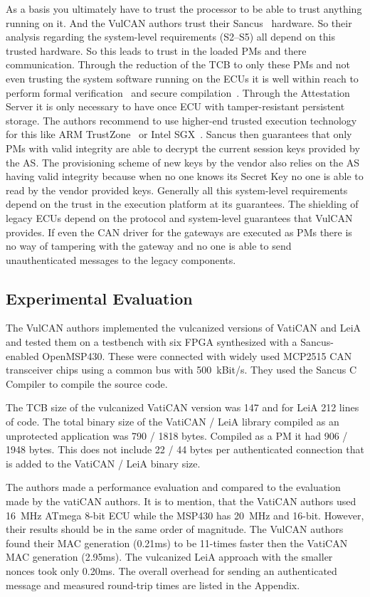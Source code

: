 \smallskip
As a basis you ultimately have to trust the processor to be able to trust
anything running on it. And the VulCAN authors trust their Sancus~\cite{Noorman}
hardware. So their analysis regarding the system-level requirements (S2--S5) all
depend on this trusted hardware. So this leads to trust in the loaded PMs and
there communication. Through the reduction of the TCB to only these PMs and not
even trusting the system software running on the ECUs it is well within reach to
perform formal verification~\cite{Philippaerts2014} and secure
compilation~\cite{Patrignani2015}. Through the Attestation Server it is only
necessary to have once ECU with tamper-resistant persistent storage. The authors
recommend to use higher-end trusted execution technology for this like ARM
TrustZone~\cite{Alves2004} or Intel SGX~\cite{McKeen2013}. Sancus then
guarantees that only PMs with valid integrity are able to decrypt the current
session keys provided by the AS\@. The provisioning scheme of new keys by the
vendor also relies on the AS having valid integrity because when no one knows
its Secret Key no one is able to read by the vendor provided keys. Generally all
this system-level requirements depend on the trust in the execution platform at
its guarantees. The shielding of legacy ECUs depend on the protocol and
system-level guarantees that VulCAN provides. If even the CAN driver for the
gateways are executed as PMs there is no way of tampering with the gateway and
no one is able to send unauthenticated messages to the legacy components.

\subsection{Experimental Evaluation}

The VulCAN authors implemented the vulcanized versions of VatiCAN and LeiA and tested them on a testbench with six FPGA synthesized with a Sancus-enabled OpenMSP430. These were connected with widely used MCP2515 CAN transceiver chips using a common bus with 500~kBit/s. They used the Sancus C Compiler to compile the source code.

The TCB size of the vulcanized VatiCAN version was 147 and for LeiA 212 lines of code. The total binary size of the VatiCAN / LeiA library compiled as an unprotected application was 790 / 1818 bytes. Compiled as a PM it had 906 / 1948 bytes. This does not include 22 / 44 bytes per authenticated connection that is added to the VatiCAN / LeiA binary size.

The authors made a performance evaluation and compared to the evaluation made by
the vatiCAN authors. It is to mention, that the VatiCAN authors used 16~MHz
ATmega 8-bit ECU while the MSP430 has 20~MHz and 16-bit. However, their results
should be in the same order of magnitude. The VulCAN authors found their MAC
generation (0.21ms) to be 11-times faster then the VatiCAN MAC generation
(2.95ms). The vulcanized LeiA approach with the smaller nonces took only 0.20ms.
The overall overhead for sending an authenticated message and measured
round-trip times are listed in the Appendix.
